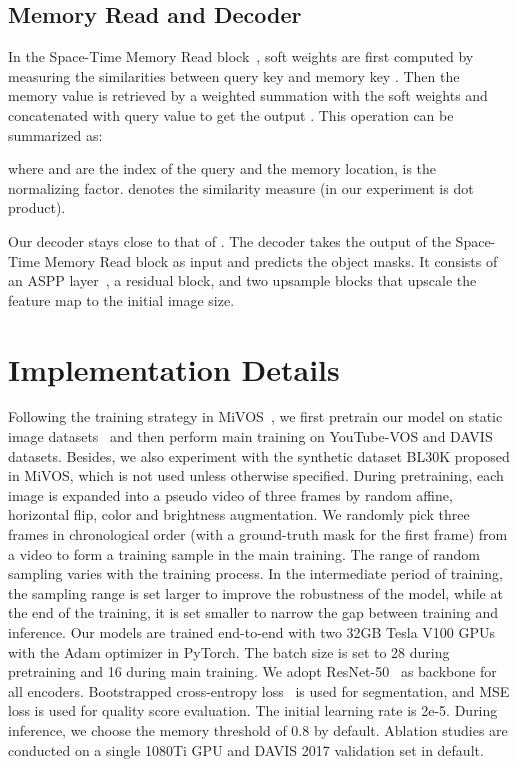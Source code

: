 \documentclass[runningheads]{llncs}
\begin{document}
\subsection{Memory Read and Decoder}


    In the Space-Time Memory Read block~\cite{stm}, soft weights are first computed by measuring the similarities between query key  and memory key . Then the memory value  is retrieved by a weighted summation with the soft weights and concatenated with query value  to get the output . This operation can be summarized as:
    
    where  and  are the index of the query and the memory location,  is the normalizing factor.  denotes the similarity measure (in our experiment is dot product).
    
    Our decoder stays close to that of \cite{decoder,stm}. The decoder takes the output  of the Space-Time Memory Read block as input and predicts the object masks. It consists of an ASPP layer~\cite{aspp}, a residual block, and two upsample blocks that upscale the feature map to the initial image size. 
\section{Implementation Details}
Following the training strategy in MiVOS~\cite{mivos}, we first pretrain our model on static image datasets~\cite{static1,static2,static3,static4,static5} and then perform main training on YouTube-VOS and DAVIS datasets. Besides, we also experiment with the synthetic dataset BL30K proposed in MiVOS, which is not used unless otherwise specified. 
    During pretraining, each image is expanded into a pseudo video of three frames by random affine, horizontal flip, color and brightness augmentation. 
    We randomly pick three frames in chronological order (with a ground-truth mask for the first frame) from a video to form a training sample in the main training.
    The range of random sampling varies with the training process.
    In the intermediate period of training, the sampling range is set larger to improve the robustness of the model, while at the end of the training, it is set smaller to narrow the gap between training and inference.
Our models are trained end-to-end with two 32GB Tesla V100 GPUs with the Adam optimizer in PyTorch. The batch size is set to 28 during pretraining and 16 during main training.
    We adopt ResNet-50~\cite{resnet} as backbone for all encoders. Bootstrapped cross-entropy loss~\cite{mivos} is used for segmentation, and MSE loss is used for quality score evaluation. 
    The initial learning rate is 2e-5.
    During inference, we choose the memory threshold  of 0.8 by default. 
    Ablation studies are conducted on a single 1080Ti GPU and DAVIS 2017 validation set in default.
    
\end{document}
